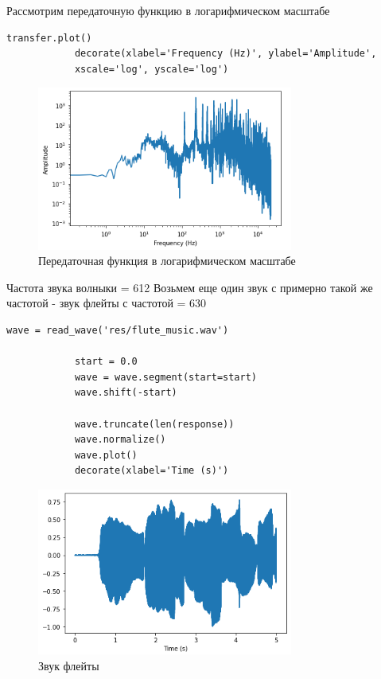 \documentclass[a4paper,12pt]{article}
\begin{document}
\begin{enumerate}
		Рассмотрим передаточную функцию в логарифмическом масштабе
		\begin{lstlisting}[caption=Передаточная функция в логарифмическом масштабе]
			transfer.plot()
			decorate(xlabel='Frequency (Hz)', ylabel='Amplitude',
			xscale='log', yscale='log')
		\end{lstlisting}
		\begin{figure}[H]
			\centering
			\includegraphics[width=0.75\textwidth]{2_3.png}
			\caption{Передаточная функция в логарифмическом масштабе}
			\label{fig:2.3}
		\end{figure}
		
		Частота звука волныки = 612
		Возьмем еще один звук с примерно такой же частотой -  звук флейты с частотой = 630
		\begin{lstlisting}[caption=Звук флейты]
			wave = read_wave('res/flute_music.wav')
			
			start = 0.0
			wave = wave.segment(start=start)
			wave.shift(-start)
			
			wave.truncate(len(response))
			wave.normalize()
			wave.plot()
			decorate(xlabel='Time (s)')
		\end{lstlisting}
		\begin{figure}[H]
			\centering
			\includegraphics[width=0.75\textwidth]{2_4.png}
			\caption{Звук флейты}
			\label{fig:2.4}
		\end{figure}
		

\end{enumerate}
\end{document}
